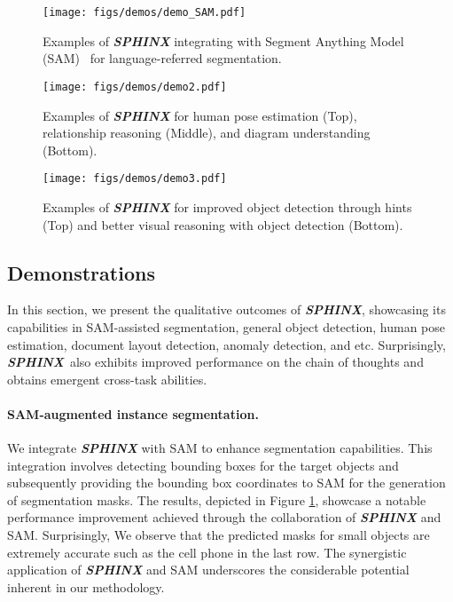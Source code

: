 \documentclass{article} \usepackage{iclr2024_conference,times}
\newcommand{\sphinx}{\textcolor{Goldenrod3}{\textbf{\textit{SPHINX}}}~}
\begin{document}
\begin{figure}[t]
    \centering
\texttt{[image: figs/demos/demo\_SAM.pdf]}
    \caption{Examples of \textcolor{Goldenrod3}{\textbf{\textit{SPHINX}}} integrating with Segment Anything Model (SAM)~\citep{kirillov2023segment} for language-referred segmentation.}
    \label{fig:demo_SAM1}
\end{figure}


\begin{figure}[http]
    \centering
    \texttt{[image: figs/demos/demo2.pdf]}
\caption{Examples of \textcolor{Goldenrod3}{\textbf{\textit{SPHINX}}} for human pose estimation (Top), relationship reasoning (Middle), and diagram understanding (Bottom).
}
    \label{fig:demo_2}
\end{figure}
\begin{figure}[h]
    \centering
    \texttt{[image: figs/demos/demo3.pdf]}
    \caption{Examples of \textcolor{Goldenrod3}{\textbf{\textit{SPHINX}}} for improved object detection through hints (Top) and better visual reasoning with object detection (Bottom).}
    \label{fig:demo_3}
\end{figure}


\subsection{Demonstrations}
In this section, we present the qualitative outcomes of \textcolor{Goldenrod3}{\textbf{\textit{SPHINX}}}, showcasing its capabilities in SAM-assisted segmentation, general object detection, human pose estimation, document layout detection, anomaly detection, and etc. 
Surprisingly, \sphinx also exhibits improved performance on the chain of thoughts and obtains emergent cross-task abilities.





\paragraph{SAM-augmented instance segmentation.}
We integrate \textcolor{Goldenrod3}{\textbf{\textit{SPHINX}}} with SAM to enhance segmentation capabilities. This integration involves detecting bounding boxes for the target objects and subsequently providing the bounding box coordinates to SAM for the generation of segmentation masks. The results, depicted in Figure \ref{fig:demo_SAM1}, showcase a notable performance improvement achieved through the collaboration of \textcolor{Goldenrod3}{\textbf{\textit{SPHINX}}} and SAM. 
Surprisingly, We observe that the predicted masks for small objects are extremely accurate such as the cell phone in the last row.
The synergistic application of \textcolor{Goldenrod3}{\textbf{\textit{SPHINX}}} and SAM underscores the considerable potential inherent in our methodology.
\end{document}
